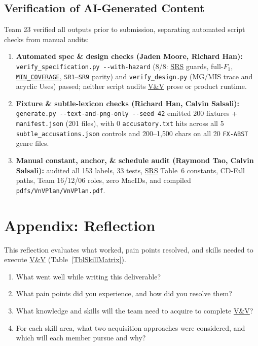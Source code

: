 \documentclass[12pt, titlepage]{article}
\newcommand{\MinCoverage}{\hyperref[const:MIN_COVERAGE]{\texttt{MIN\_\allowbreak{}COVERAGE}}}
\newcommand{\SRS}{\hyperlink{vnv-acr-srs}{SRS}}
\newcommand{\VnV}{\hyperlink{vnv-acr-vnv}{V\&V}}
\begin{document}
\subsection{Verification of AI-Generated Content}
Team 23 verified all outputs prior to submission, separating automated script checks from manual audits:
\begin{enumerate}[leftmargin=*, itemsep=0.5pt, topsep=2pt]
    \item \textbf{Automated spec \& design checks (Jaden Moore, Richard Han):} \texttt{verify\_\allowbreak{}specification.py -{}-with-hazard} (8/8: \SRS{} guards, full-$F_1$, \MinCoverage{}, \texttt{SR1}--\texttt{SR9} parity) and \texttt{verify\_\allowbreak{}design.py} (MG/MIS trace and acyclic Uses) passed; neither script audits \VnV{} prose or product runtime.
    \item \textbf{Fixture \& subtle-lexicon checks (Richard Han, Calvin Salsali):} \texttt{generate.py -{}-text-and-png-only -{}-seed 42} emitted 200 fixtures + \texttt{manifest.json} (201 files), with 0 \texttt{accusatory.txt} hits across all 5 \texttt{subtle\_\allowbreak{}accusations.json} controls and 200--1{,}500 chars on all 20 \texttt{FX-ABST} genre files.
    \item \textbf{Manual constant, anchor, \& schedule audit (Raymond Tao, Calvin Salsali):} audited all 153 labels, 33 tests, \SRS{} Table~6 constants, CD-Fall paths, Team 16/12/06 roles, zero MacIDs, and compiled \texttt{pdfs/\allowbreak{}VnVPlan/\allowbreak{}VnVPlan.pdf}.
\end{enumerate}

\section{Appendix: Reflection}\label{sec:reflection}

This reflection evaluates what worked, pain points resolved, and skills needed to execute \VnV{} (Table~\ref{TblSkillMatrix}).



\begin{enumerate}[leftmargin=*, itemsep=0pt, topsep=2pt]
  \item What went well while writing this deliverable?
  \item What pain points did you experience, and how did you resolve them?
  \item What knowledge and skills will the team need to acquire to complete \VnV{}?
  \item For each skill area, what two acquisition approaches were considered, and which will each member pursue and why?
\end{enumerate}
\end{document}
